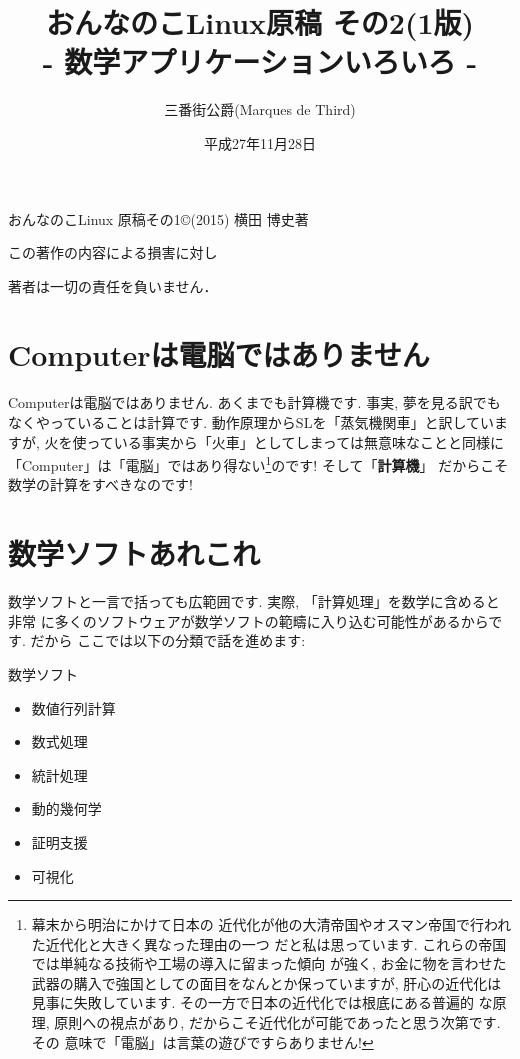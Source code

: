 \documentclass[b5j,8pt,twocolumn]{ltjsarticle}
\title{おんなのこLinux原稿 その2(1版)\\
- 数学アプリケーションいろいろ -}
\author{三番街公爵(Marques de Third)}
\date{
平成27年11月28日
 }
\begin{document}
\maketitle

\vspace{10cm}

おんなのこLinux 原稿その1\copyright (2015) 横田 博史著\par

この著作の内容による損害に対し

著者は一切の責任を負いません．
\clearpage
\newpage
\setcounter{page}{1}



\section{Computerは電脳ではありません}

Computerは電脳ではありません. あくまでも計算機です. 事実, 夢を見る訳でも
なくやっていることは計算です. 動作原理からSLを「蒸気機関車」と訳していますが,
 火を使っている事実から「火車」としてしまっては無意味なことと同様に
「Computer」は「電脳」ではあり得ない\footnote{幕末から明治にかけて日本の
近代化が他の大清帝国やオスマン帝国で行われた近代化と大きく異なった理由の一つ
だと私は思っています. これらの帝国では単純なる技術や工場の導入に留まった傾向
が強く, お金に物を言わせた武器の購入で強国としての面目をなんとか保っていますが,
 肝心の近代化は見事に失敗しています. その一方で日本の近代化では根底にある普遍的
な原理, 原則への視点があり, だからこそ近代化が可能であったと思う次第です. その
意味で「電脳」は言葉の遊びですらありません!}のです! そして「\textbf{計算機}」
だからこそ数学の計算をすべきなのです! 

\section{数学ソフトあれこれ}

数学ソフトと一言で括っても広範囲です. 実際, 「計算処理」を数学に含めると非常
に多くのソフトウェアが数学ソフトの範疇に入り込む可能性があるからです. だから
ここでは以下の分類で話を進めます:

\vspace{0.2cm}
\begin{itembox}[c]{数学ソフト}
\begin{itemize}
\item{数値行列計算}
\item{数式処理}
\item{統計処理}
\item{動的幾何学}
\item{証明支援}
\item{可視化}
\end{itemize}
\end{itembox}
\end{document}
